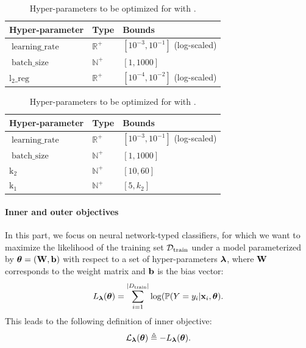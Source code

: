 \documentclass[twoside,11pt]{article}
\begin{document}
\begin{table}[ht]
\centering
\begin{tabular}{@{}lll@{}}
\toprule
\textbf{Hyper-parameter} & \textbf{Type}                      & \textbf{Bounds}               \\ \midrule
$\operatorname{learning\_rate}$                & $\mathbb{R}^+$ & $\left[ 10^{-3}, 10^{-1} \right]$ (log-scaled) \\
$\operatorname{batch\_size}$           & $\mathbb{N}^+$ & $\left[1, 1000 \right]$         \\
$\operatorname{l_2\_reg}$		& $\mathbb{R}^+$ & $\left[ 10^{-4}, 10^{-2} \right]$ (log-scaled) \\ \bottomrule
\end{tabular}
\caption{Hyper-parameters to be optimized for \MLP with \SGD.}
\label{mlp_sgd}
\end{table}

\begin{table}[ht]
\centering
\begin{tabular}{@{}lll@{}}
\toprule
\textbf{Hyper-parameter} & \textbf{Type}                      & \textbf{Bounds}               \\ \midrule
$\operatorname{learning\_rate}$                & $\mathbb{R}^+$ & $\left[ 10^{-3}, 10^{-1} \right]$ (log-scaled) \\
$\operatorname{batch\_size}$           & $\mathbb{N}^+$ & $\left[1, 1000 \right]$         \\
$\operatorname{k_2}$           & $\mathbb{N}^+$ & $\left[10,  60 \right]$         \\
$\operatorname{k_1}$           & $\mathbb{N}^+$ & $\left[5,  k_2 \right]$         \\ \bottomrule
\end{tabular}
\caption{Hyper-parameters to be optimized for \CNN with \SGD.}
\label{cnn_sgd}
\end{table}

\paragraph{Inner and outer objectives} In this part, we focus on neural network-typed classifiers, for which we want to maximize the likelihood of the training set $\mathcal{D}_{\operatorname{train}}$ under a model parameterized by ${\boldsymbol \theta} = ({\bf W}, {\bf b})$ with respect to a set of hyper-parameters ${\boldsymbol \lambda}$, where ${\bf W}$ corresponds to the weight matrix and ${\bf b}$ is the bias vector:
\[
L_{{\boldsymbol \lambda}}({\boldsymbol \theta}) = \sum_{i=1}^{|D_{\operatorname{train}}|} \log (\mathbb{P}(Y=y_i|{\bf x}_i,{\boldsymbol \theta}).
\]
This leads to the following definition of inner objective:
\[
\mathcal{L}_{{\boldsymbol \lambda}}({\boldsymbol \theta}) \triangleq -L_{{\boldsymbol \lambda}}({\boldsymbol \theta}).
\]
\end{document}
